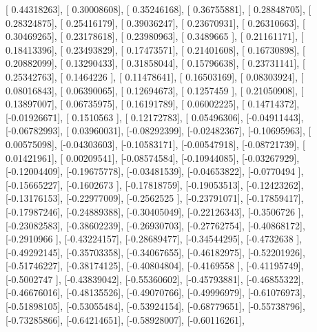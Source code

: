 \documentclass{article}
\begin{document}
       [ 0.44318263],
       [ 0.30008608],
       [ 0.35246168],
       [ 0.36755881],
       [ 0.28848705],
       [ 0.28324875],
       [ 0.25416179],
       [ 0.39036247],
       [ 0.23670931],
       [ 0.26310663],
       [ 0.30469265],
       [ 0.23178618],
       [ 0.23980963],
       [ 0.3489665 ],
       [ 0.21161171],
       [ 0.18413396],
       [ 0.23493829],
       [ 0.17473571],
       [ 0.21401608],
       [ 0.16730898],
       [ 0.20882099],
       [ 0.13290433],
       [ 0.31858044],
       [ 0.15796638],
       [ 0.23731141],
       [ 0.25342763],
       [ 0.1464226 ],
       [ 0.11478641],
       [ 0.16503169],
       [ 0.08303924],
       [ 0.08016843],
       [ 0.06390065],
       [ 0.12694673],
       [ 0.1257459 ],
       [ 0.21050908],
       [ 0.13897007],
       [ 0.06735975],
       [ 0.16191789],
       [ 0.06002225],
       [ 0.14714372],
       [-0.01926671],
       [ 0.1510563 ],
       [ 0.12172783],
       [ 0.05496306],
       [-0.04911443],
       [-0.06782993],
       [ 0.03960031],
       [-0.08292399],
       [-0.02482367],
       [-0.10695963],
       [ 0.00575098],
       [-0.04303603],
       [-0.10583171],
       [-0.00547918],
       [-0.08721739],
       [ 0.01421961],
       [ 0.00209541],
       [-0.08574584],
       [-0.10944085],
       [-0.03267929],
       [-0.12004409],
       [-0.19675778],
       [-0.03481539],
       [-0.04653822],
       [-0.0770494 ],
       [-0.15665227],
       [-0.1602673 ],
       [-0.17818759],
       [-0.19053513],
       [-0.12423262],
       [-0.13176153],
       [-0.22977009],
       [-0.2562525 ],
       [-0.23791071],
       [-0.17859417],
       [-0.17987246],
       [-0.24889388],
       [-0.30405049],
       [-0.22126343],
       [-0.3506726 ],
       [-0.23082583],
       [-0.38602239],
       [-0.26930703],
       [-0.27762754],
       [-0.40868172],
       [-0.2910966 ],
       [-0.43224157],
       [-0.28689477],
       [-0.34544295],
       [-0.4732638 ],
       [-0.49292145],
       [-0.35703358],
       [-0.34067655],
       [-0.46182975],
       [-0.52201926],
       [-0.51746227],
       [-0.38174125],
       [-0.40804804],
       [-0.4169558 ],
       [-0.41195749],
       [-0.5002747 ],
       [-0.43839042],
       [-0.55360602],
       [-0.45793881],
       [-0.46855322],
       [-0.46676016],
       [-0.48135526],
       [-0.49070766],
       [-0.49996979],
       [-0.61076973],
       [-0.51898105],
       [-0.53055484],
       [-0.53924154],
       [-0.68779651],
       [-0.55738796],
       [-0.73285866],
       [-0.64214651],
       [-0.58928007],
       [-0.60116261],
\end{document}
